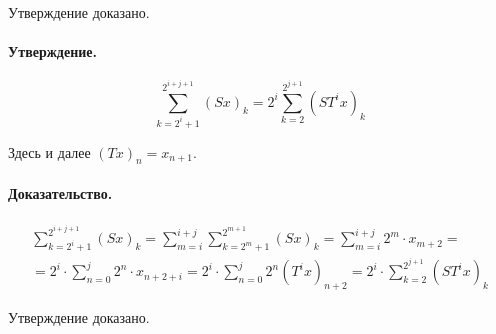 \documentclass[a4paper,14pt]{article} %
\begin{document}
Утверждение доказано.


\paragraph{Утверждение.}
\begin{equation}\label{summa_S}
	\sum_{k=2^i+1}^{2^{i+j+1}} (Sx)_k =
	2^i\sum_{k=2}^{2^{j+1}} (ST^ix)_k
\end{equation}

Здесь и далее $(Tx)_n = x_{n+1}$.

\paragraph{Доказательство.}

\begin{multline*}
	\sum_{k=2^i+1}^{2^{i+j+1}} (Sx)_k =
	\sum_{m = i}^{i+j}\sum_{k=2^m+1}^{2^{m+1}} (Sx)_k =
	\sum_{m = i}^{i+j}2^m \cdot x_{m+2} =
	\\=
	2^i \cdot \sum_{n = 0}^{j}2^n \cdot x_{n+2+i} =
	2^i \cdot \sum_{n = 0}^{j}2^n (T^i x)_{n+2} =
	2^i \cdot \sum_{k=2}^{2^{j+1}} (ST^i x)_k
\end{multline*}

Утверждение доказано.
\end{document}
